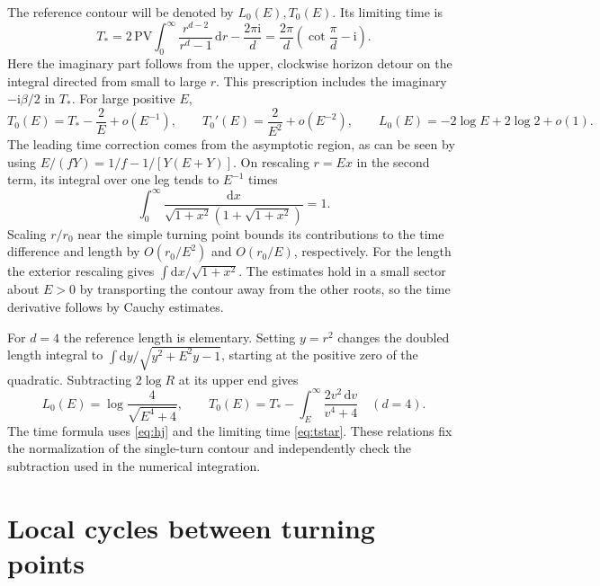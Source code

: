 \documentclass[11pt,a4paper]{article}
\newcommand{\dd}{\mathrm{d}}
\newcommand{\ii}{\mathrm{i}}
\begin{document}
The reference contour will be denoted by \(L_0(E),T_0(E)\). Its limiting time is
\begin{equation}
 T_*=
 2\,\mathrm{PV}\!\int_0^\infty \frac{r^{d-2}}{r^d-1}\,\dd r
 -\frac{2\pi\ii}{d}
 =\frac{2\pi}{d}\left(\cot\frac{\pi}{d}-\ii\right).
 \label{eq:tstar}
\end{equation}
Here the imaginary part follows from the upper, clockwise horizon detour on the integral directed from small to large \(r\). This prescription includes the imaginary \(-\ii\beta/2\) in \(T_*\). For large positive \(E\),
\begin{equation}
 T_0(E)=T_*-\frac{2}{E}+o(E^{-1}),
 \qquad T_0'(E)=\frac{2}{E^2}+o(E^{-2}),
 \qquad L_0(E)=-2\log E+2\log 2+o(1).
 \label{eq:reference-asymptotics}
\end{equation}
The leading time correction comes from the asymptotic region, as can be seen by using \(E/(fY)=1/f-1/[Y(E+Y)]\). On rescaling \(r=E x\) in the second term, its integral over one leg tends to \(E^{-1}\) times
\begin{equation}
 \int_0^\infty\frac{\dd x}{\sqrt{1+x^2}(1+\sqrt{1+x^2})}=1 .
\end{equation}
Scaling \(r/r_0\) near the simple turning point bounds its contributions to the time difference and length by \(O(r_0/E^2)\) and \(O(r_0/E)\), respectively. For the length the exterior rescaling gives \(\int\dd x/\sqrt{1+x^2}\). The estimates hold in a small sector about \(E>0\) by transporting the contour away from the other roots, so the time derivative follows by Cauchy estimates.

For \(d=4\) the reference length is elementary. Setting \(y=r^2\) changes the doubled length integral to \(\int\dd y/\sqrt{y^2+E^2y-1}\), starting at the positive zero of the quadratic. Subtracting \(2\log R\) at its upper end gives
\begin{equation}
 L_0(E)=\log\frac{4}{\sqrt{E^4+4}},\qquad
 T_0(E)=T_*-\int_E^\infty\frac{2v^2\,\dd v}{v^4+4}\quad(d=4).
 \label{eq:exact-five}
\end{equation}
The time formula uses \eqref{eq:hj} and the limiting time \eqref{eq:tstar}. These relations fix the normalization of the single-turn contour and independently check the subtraction used in the numerical integration.

\section{Local cycles between turning points}
\label{sec:cycles}
\end{document}
